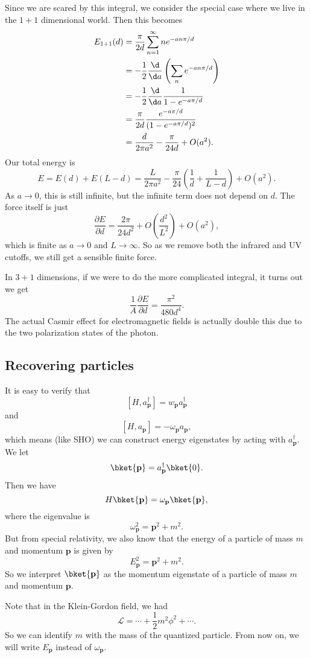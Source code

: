 \documentclass[a4paper]{article}
\begin{document}
Since we are scared by this integral, we consider the special case where we live in the $1 + 1$ dimensional world. Then this becomes
\begin{align*}
  E_{1 + 1}(d) &= \frac{\pi}{2d} \sum_{n = 1}^\infty n e^{-an\pi/d} \\
  &= -\frac{1}{2} \frac{\d}{\d a}\left(\sum_n e^{-an\pi/d}\right)\\
  &= -\frac{1}{2} \frac{\d}{\d a} \frac{1}{1 - e^{-a\pi/d}}\\
  &= \frac{\pi}{2d}\frac{e^{-a\pi/d}}{(1 - e^{-a\pi/d})^2}\\
  &= \frac{d}{2\pi a^2} - \frac{\pi}{24 d} + O(a^2).
\end{align*}
Our total energy is
\[
  E = E(d) + E(L - d) = \frac{L}{2\pi a^2} - \frac{\pi}{24}\left(\frac{1}{d} + \frac{1}{L - d}\right) + O(a^2).
\]
As $a \to 0$, this is still infinite, but the infinite term does not depend on $d$. The force itself is just
\[
  \frac{\partial E}{\partial d} = \frac{2\pi}{24 d^2} + O\left(\frac{d^2}{L^2}\right) + O(a^2),
\]
which is finite as $a \to 0$ and $L \to \infty$. So as we remove both the infrared and UV cutoffs, we still get a sensible finite force.

In $3 + 1$ dimensions, if we were to do the more complicated integral, it turns out we get
\[
  \frac{1}{A}\frac{\partial E}{\partial d} = \frac{\pi^2}{480 d^4}.
\]
The actual Casmir effect for electromagnetic fields is actually double this due to the two polarization states of the photon.

\subsection{Recovering particles}
It is easy to verify that
\[
  [H, a_\mathbf{p}^\dagger] = w_\mathbf{p} a_\mathbf{p}^\dagger
\]
and
\[
  [H, a_\mathbf{p}] = - \omega_\mathbf{p} a_\mathbf{p},
\]
which means (like SHO) we can construct energy eigenstates by acting with $a_\mathbf{p}^\dagger$. We let
\[
  \bket{\mathbf{p}} = a_\mathbf{p}^\dagger \bket{0}.
\]
Then we have
\[
  H\bket{\mathbf{p}} = \omega_\mathbf{p} \bket{\mathbf{p}},
\]
where the eigenvalue is
\[
  \omega_\mathbf{p}^2 = \mathbf{p}^2 + m^2.
\]
But from special relativity, we also know that the energy of a particle of mass $m$ and momentum $\mathbf{p}$ is given by
\[
  E_\mathbf{p}^2 = \mathbf{p}^2 + m^2.
\]
So we interpret $\bket{\mathbf{p}}$ as the momentum eigenstate of a particle of mass $m$ and momentum $\mathbf{p}$.

Note that in the Klein-Gordon field, we had
\[
  \mathcal{L} = \cdots + \frac{1}{2}m^2 \phi^2 + \cdots.
\]
So we can identify $m$ with the mass of the quantized particle. From now on, we will write $E_\mathbf{p}$ instead of $\omega_\mathbf{p}$.
\end{document}
